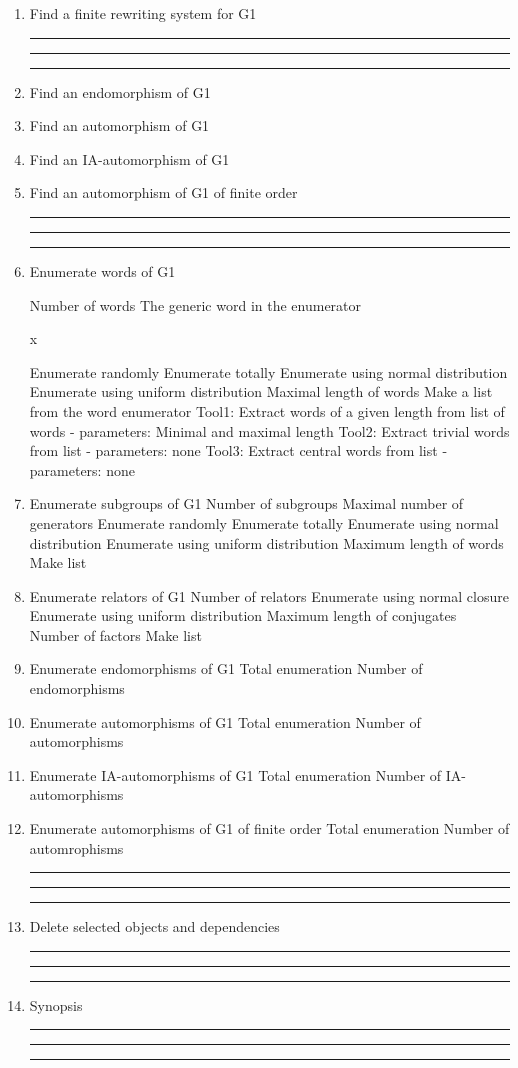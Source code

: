 \begin{enumerate}
\bigskip
\hrule\hrule\hrule
\item Find a finite rewriting system for G1

\bigskip
\hrule\hrule\hrule

\item Find an endomorphism of G1

\item Find an automorphism of G1

\item Find an IA-automorphism of G1

\item Find an automorphism of G1 of finite order

\bigskip
\hrule\hrule\hrule
\item Enumerate words of G1

\subitem Number of words
\subsubitem The generic word in the enumerator

\hskip 2.0in    x

\subsubitem Enumerate randomly
\subsubitem Enumerate totally
\subsubitem Enumerate using normal distribution
\subsubitem Enumerate using uniform distribution
\subsubitem Maximal length of words
\bigskip
\subitem Make a list from the word enumerator
\subsubitem Tool1: Extract words of a given length
from list of words - parameters: Minimal and maximal length
\subsubitem Tool2: Extract trivial words from list - parameters: none
\subsubitem Tool3: Extract central words from list - parameters: none
\bigskip
\item Enumerate subgroups of G1
\subitem Number of subgroups
\subitem Maximal number of generators
\subsubitem Enumerate randomly
\subsubitem Enumerate totally
\subsubitem Enumerate using normal distribution
\subsubitem Enumerate using uniform distribution
\subsubitem Maximum length of words
\bigskip
\subitem Make list
\bigskip
\item Enumerate relators of G1
\subitem Number of relators
\subsubitem Enumerate using normal closure
\subsubitem Enumerate using uniform distribution
\subsubitem Maximum length of conjugates
\subsubitem Number of factors
\subitem Make list

\bigskip
\item Enumerate endomorphisms of G1
\subitem Total enumeration
\subsubitem Number of endomorphisms

 \bigskip
\item Enumerate automorphisms of G1
\subitem Total enumeration
\subsubitem Number of automorphisms

\bigskip
\item Enumerate IA-automorphisms of G1
\subitem Total enumeration
\subsubitem Number of IA-automorphisms

\bigskip
\item Enumerate automorphisms of G1 of finite order
\subitem Total enumeration
\subsubitem Number of automrophisms
\bigskip
\hrule\hrule\hrule

\item Delete selected objects and dependencies

\bigskip
\hrule\hrule\hrule

\item
Synopsis

\bigskip
\hrule\hrule\hrule

\end{enumerate}
